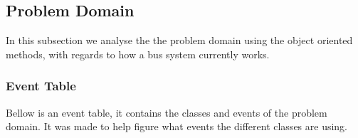 \subsection{Problem Domain}
In this subsection we analyse the the problem domain using the object oriented methods, with regards to how a bus system currently works.

\subsubsection{Event Table}

Bellow is an event table, it contains the classes and events of the problem domain. It was made to help figure what events the different classes are using.

\begin{table}[H]
\centering
{}
\end{table}
